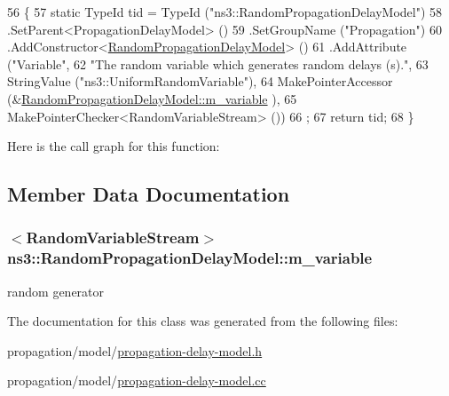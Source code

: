 \begin{DoxyCode}
56 \{
57   \textcolor{keyword}{static} TypeId tid = TypeId (\textcolor{stringliteral}{"ns3::RandomPropagationDelayModel"})
58     .SetParent<PropagationDelayModel> ()
59     .SetGroupName (\textcolor{stringliteral}{"Propagation"})
60     .AddConstructor<\hyperlink{classns3_1_1RandomPropagationDelayModel_a0d1c542e88c544cecdd4dd1443771985}{RandomPropagationDelayModel}> ()
61     .AddAttribute (\textcolor{stringliteral}{"Variable"},
62                    \textcolor{stringliteral}{"The random variable which generates random delays (s)."},
63                    StringValue (\textcolor{stringliteral}{"ns3::UniformRandomVariable"}),
64                    MakePointerAccessor (&\hyperlink{classns3_1_1RandomPropagationDelayModel_a1f026b6a646d862d0eca4ba3906cd8a2}{RandomPropagationDelayModel::m\_variable}
      ),
65                    MakePointerChecker<RandomVariableStream> ())
66   ;
67   \textcolor{keywordflow}{return} tid;
68 \}
\end{DoxyCode}


Here is the call graph for this function\+:




\subsection{Member Data Documentation}
\subsubsection[{\texorpdfstring{m\+\_\+variable}{m_variable}}]{$<${\bf Random\+Variable\+Stream}$>$ ns3\+::\+Random\+Propagation\+Delay\+Model\+::m\+\_\+variable\hspace{0.3cm}{\ttfamily [private]}}\hypertarget{classns3_1_1RandomPropagationDelayModel_a1f026b6a646d862d0eca4ba3906cd8a2}{}\label{classns3_1_1RandomPropagationDelayModel_a1f026b6a646d862d0eca4ba3906cd8a2}


random generator 



The documentation for this class was generated from the following files\+:\begin{DoxyCompactItemize}
\item 
propagation/model/\hyperlink{propagation-delay-model_8h}{propagation-\/delay-\/model.\+h}\item 
propagation/model/\hyperlink{propagation-delay-model_8cc}{propagation-\/delay-\/model.\+cc}\end{DoxyCompactItemize}
